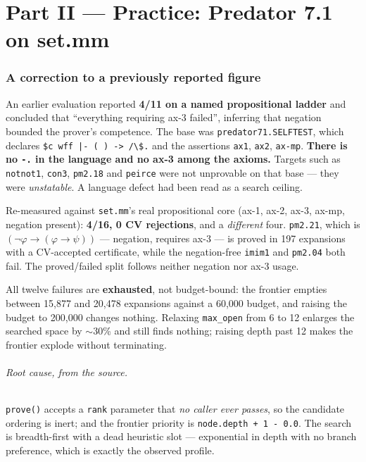 \documentclass[11pt,a4paper]{article}
\begin{document}
\part*{Part II --- Practice: Predator 7.1 on set.mm}

\section{A correction to a previously reported figure}

An earlier evaluation reported \textbf{4/11 on a named propositional ladder}
and concluded that ``everything requiring ax-3 failed'', inferring that
negation bounded the prover's competence. The base was
\texttt{predator71.SELFTEST}, which declares
\texttt{\$c wff |- ( ) -> /\textbackslash \$.} and the assertions
\texttt{ax1}, \texttt{ax2}, \texttt{ax-mp}. \textbf{There is no
\texttt{-.} in the language and no ax-3 among the axioms.} Targets such as
\texttt{notnot1}, \texttt{con3}, \texttt{pm2.18} and \texttt{peirce} were not
unprovable on that base --- they were \emph{unstatable}. A language defect had
been read as a search ceiling.

Re-measured against \texttt{set.mm}'s real propositional core (ax-1, ax-2,
ax-3, ax-mp, negation present): \textbf{4/16, 0 CV rejections}, and a
\emph{different} four. \texttt{pm2.21}, which is
$(\lnot \varphi \to (\varphi \to \psi))$ --- negation, requires ax-3 --- is
proved in 197 expansions with a CV-accepted certificate, while the
negation-free \texttt{imim1} and \texttt{pm2.04} both fail. The proved/failed
split follows neither negation nor ax-3 usage.

All twelve failures are \textbf{exhausted}, not budget-bound: the frontier
empties between 15{,}877 and 20{,}478 expansions against a 60{,}000 budget, and
raising the budget to 200{,}000 changes nothing. Relaxing \texttt{max\_open}
from 6 to 12 enlarges the searched space by $\sim$30\% and still finds nothing;
raising depth past 12 makes the frontier explode without terminating.

\paragraph{Root cause, from the source.} \texttt{prove()} accepts a
\texttt{rank} parameter that \emph{no caller ever passes}, so the candidate
ordering is inert; and the frontier priority is
\texttt{node.depth + 1 - 0.0}. The search is breadth-first with a dead
heuristic slot --- exponential in depth with no branch preference, which is
exactly the observed profile.
\end{document}
